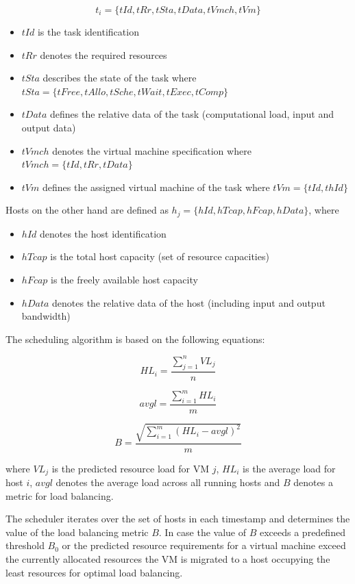 \[t_i = \{tId, tRr, tSta, tData, tVmch, tVm\}\]

\begin{itemize}
	\item $tId$ is the task identification
	\item $tRr$ denotes the required resources
	\item $tSta$ describes the state of the task where $tSta = \{tFree,tAllo,tSche,tWait,tExec,tComp\}$
	\item $tData$ defines the relative data of the task (computational load, input and output data)
	\item $tVmch$ denotes the virtual machine specification where $tVmch = \{tId,tRr,tData\}$
	\item $tVm$ defines the assigned virtual machine of the task where $tVm = \{tId,thId\}$
\end{itemize}

Hosts on the other hand are defined as $h_j = \{hId, hTcap, hFcap, hData\}$, where

\begin{itemize}
	\item $hId$ denotes the host identification
	\item $hTcap$ is the total host capacity (set of resource capacities)
	\item $hFcap$ is the freely available host capacity
	\item $hData$ denotes the relative data of the host (including input and output bandwidth)
\end{itemize}


The scheduling algorithm is based on the following equations: 

\[ HL_i = \frac{\sum_{j=1}^{n}{VL_j}}{n} \]

\[ avgl = \frac{\sum_{i=1}^{m}{HL_i}}{m} \]

\[ B = \frac{\sqrt{\sum_{i=1}^{m}{(HL_i - avgl)^2}}}{m} \]

where $VL_j$ is the predicted resource load for VM $j$, $HL_i$ is the average load for host $i$, $avgl$ denotes the average
load across all running hosts and $B$ denotes a metric for load balancing. 

The scheduler iterates over the set of hosts in each timestamp and determines the value of the load balancing metric $B$. In case the value of 
$B$ exceeds a predefined threshold $B_0$ or the predicted resource requirements for a virtual machine exceed the currently allocated resources 
the VM is migrated to a host occupying the least resources for optimal load balancing. 

